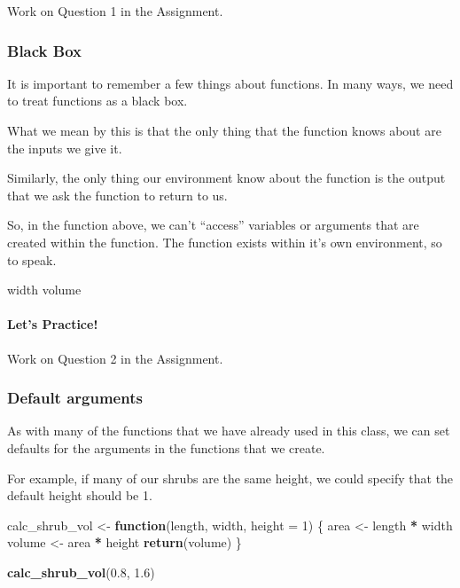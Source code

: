 \documentclass[
]{article}
\newenvironment{Shaded}{\begin{snugshade}}{\end{snugshade}}
\newcommand{\AttributeTok}[1]{\textcolor[rgb]{0.13,0.29,0.53}{#1}}
\newcommand{\ControlFlowTok}[1]{\textcolor[rgb]{0.13,0.29,0.53}{\textbf{#1}}}
\newcommand{\DecValTok}[1]{\textcolor[rgb]{0.00,0.00,0.81}{#1}}
\newcommand{\FloatTok}[1]{\textcolor[rgb]{0.00,0.00,0.81}{#1}}
\newcommand{\FunctionTok}[1]{\textcolor[rgb]{0.13,0.29,0.53}{\textbf{#1}}}
\newcommand{\NormalTok}[1]{#1}
\newcommand{\OtherTok}[1]{\textcolor[rgb]{0.56,0.35,0.01}{#1}}
\newcommand{\SpecialCharTok}[1]{\textcolor[rgb]{0.81,0.36,0.00}{\textbf{#1}}}
\begin{document}
Work on Question 1 in the Assignment.

\hypertarget{black-box}{%
\subsubsection{Black Box}\label{black-box}}

It is important to remember a few things about functions. In many ways,
we need to treat functions as a black box.

What we mean by this is that the only thing that the function knows
about are the inputs we give it.

Similarly, the only thing our environment know about the function is the
output that we ask the function to return to us.

So, in the function above, we can't ``access'' variables or arguments
that are created within the function. The function exists within it's
own environment, so to speak.

\begin{Shaded}
\begin{Highlighting}[]
\NormalTok{width}
\NormalTok{volume}
\end{Highlighting}
\end{Shaded}

\hypertarget{lets-practice-1}{%
\paragraph{Let's Practice!}\label{lets-practice-1}}

Work on Question 2 in the Assignment.

\hypertarget{default-arguments}{%
\subsubsection{Default arguments}\label{default-arguments}}

As with many of the functions that we have already used in this class,
we can set defaults for the arguments in the functions that we create.

For example, if many of our shrubs are the same height, we could specify
that the default height should be 1.

\begin{Shaded}
\begin{Highlighting}[]
\NormalTok{calc\_shrub\_vol }\OtherTok{\textless{}{-}} \ControlFlowTok{function}\NormalTok{(length, width, }\AttributeTok{height =} \DecValTok{1}\NormalTok{) \{}
\NormalTok{  area }\OtherTok{\textless{}{-}}\NormalTok{ length }\SpecialCharTok{*}\NormalTok{ width}
\NormalTok{  volume }\OtherTok{\textless{}{-}}\NormalTok{ area }\SpecialCharTok{*}\NormalTok{ height}
  \FunctionTok{return}\NormalTok{(volume)}
\NormalTok{\}}

\FunctionTok{calc\_shrub\_vol}\NormalTok{(}\FloatTok{0.8}\NormalTok{, }\FloatTok{1.6}\NormalTok{)}
\end{Highlighting}
\end{Shaded}
\end{document}
